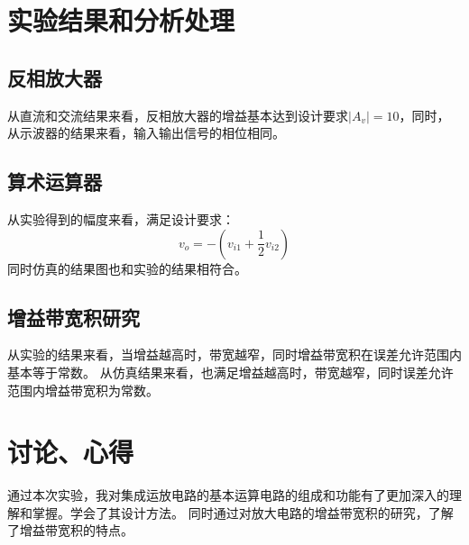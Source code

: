 \documentclass{../source/Experiment}
\begin{document}
    \section{实验结果和分析处理}
        \subsection{反相放大器}
        从直流和交流结果来看，反相放大器的增益基本达到设计要求$|A_v| = 10$，同时，从示波器的结果来看，输入输出信号的相位相同。
        \subsection{算术运算器}
        从实验得到的幅度来看，满足设计要求：
        $$v_o = -(v_{i1} + \frac{1}{2}v_{i2})$$
        同时仿真的结果图也和实验的结果相符合。
        \subsection{增益带宽积研究} 
        从实验的结果来看，当增益越高时，带宽越窄，同时增益带宽积在误差允许范围内基本等于常数。
        从仿真结果来看，也满足增益越高时，带宽越窄，同时误差允许范围内增益带宽积为常数。
    \section{讨论、心得}
        通过本次实验，我对集成运放电路的基本运算电路的组成和功能有了更加深入的理解和掌握。学会了其设计方法。
        同时通过对放大电路的增益带宽积的研究，了解了增益带宽积的特点。
\end{document}
